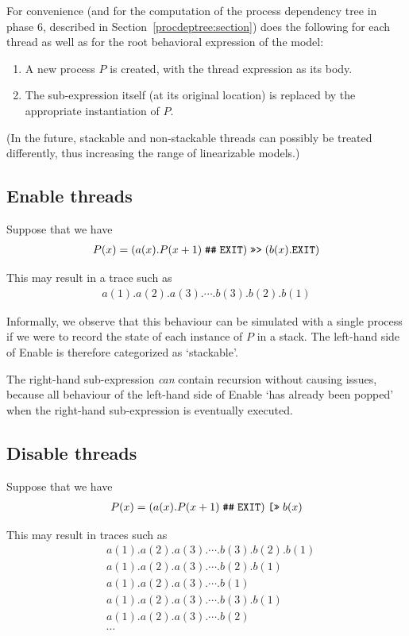 For convenience (and for the computation of the process dependency tree in phase 6, described in Section~\ref{procdeptree:section}) \lpeq{} does the following for each thread as well as for the root behavioral expression of the model:
\begin{enumerate}[1.]
\item A new process $P$ is created, with the thread expression as its body.
\item The sub-expression itself (at its original location) is replaced by the appropriate instantiation of $P$.
\end{enumerate}

(In the future, stackable and non-stackable threads can possibly be treated differently, thus increasing the range of linearizable models.)

\subsection{Enable threads}

Suppose that we have
\begin{align*}
P(x) = (a(x).P(x + 1)\;\texttt{\#\#}\;\texttt{EXIT}{})\;\texttt{>>>}\;(b(x).\texttt{EXIT}{})
\end{align*}

This may result in a trace such as
\begin{align*}
a(1).a(2).a(3).\cdots{}.b(3).b(2).b(1)
\end{align*}

Informally, we observe that this behaviour can be simulated with a single process if we were to record the state of each instance of $P$ in a stack.
The left-hand side of Enable is therefore categorized as `stackable'.

The right-hand sub-expression \emph{can} contain recursion without causing issues, because all behaviour of the left-hand side of Enable `has already been popped' when the right-hand sub-expression is eventually executed.

\subsection{Disable threads}

Suppose that we have
\begin{align*}
P(x) = (a(x).P(x + 1)\;\texttt{\#\#}\;\texttt{EXIT}{})\;\texttt{[>>}\;b(x)
\end{align*}

This may result in traces such as
\begin{align*}
&a(1).a(2).a(3).\cdots{}.b(3).b(2).b(1) \\
&a(1).a(2).a(3).\cdots{}.b(2).b(1) \\
&a(1).a(2).a(3).\cdots{}.b(1) \\
&a(1).a(2).a(3).\cdots{}.b(3).b(1) \\
&a(1).a(2).a(3).\cdots{}.b(2) \\
&\cdots{}
\end{align*}

